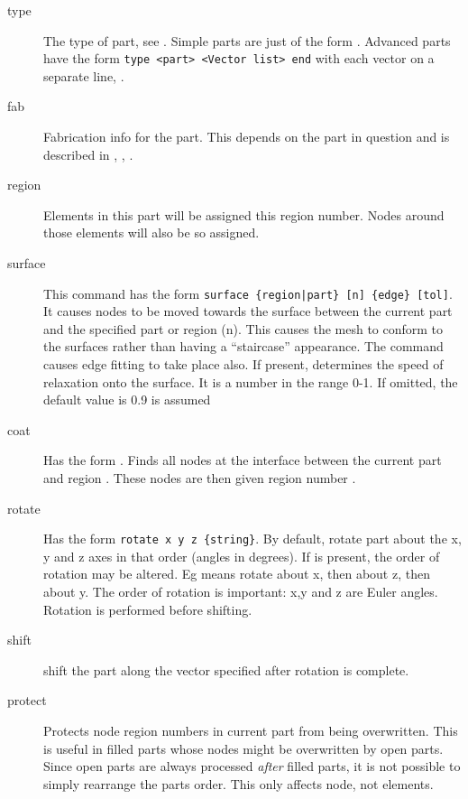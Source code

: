 \documentclass[a4paper,twoside,11pt]{book}
\begin{document}
\begin{description}
  \item[type] The type of part, see . Simple parts are just of the
    form . Advanced parts  have the form
    \verb+type <part> <Vector list> end+ with each vector on a
    separate line, .
  \item[fab] Fabrication info for the part. This depends on the part
    in question and is described in , ,
    .
  \item[region] Elements in this part will be assigned this region
    number. Nodes around those elements will also be so assigned.
  \item[surface] This command has the form
    \verb+surface {region|part} [n] {edge} [tol]+. It causes nodes to
    be moved towards the surface between the current part and the
    specified part or region (n). This causes the mesh to conform to
    the surfaces rather than having a ``staircase'' appearance. The
     command causes edge fitting to take place also. If
    present,  determines the speed of relaxation onto the
    surface. It is a number in the range 0-1. If omitted, the default
    value is 0.9 is assumed
  \item[coat] Has the form . Finds all nodes at
    the interface between the current part and region . These
    nodes are then given region number .
  \item[rotate] Has the form \verb+rotate x y z {string}+. By default,
    rotate part about the x, y and z axes in that order (angles in
    degrees). If  is present, the order of rotation may be
    altered. Eg  means rotate about x, then about z, then
    about y. The order of rotation is important: x,y and z are Euler
    angles. Rotation is performed before shifting.
  \item[shift]  shift the part along the vector
    specified after rotation is complete.
  \item[protect] Protects node region numbers in current part from
    being overwritten. This is useful in filled parts whose nodes
    might be overwritten by open parts. Since open parts are always
    processed \emph{after} filled parts, it is not possible to simply
    rearrange the parts order. This only affects node, not elements.
\end{description}
\end{document}
